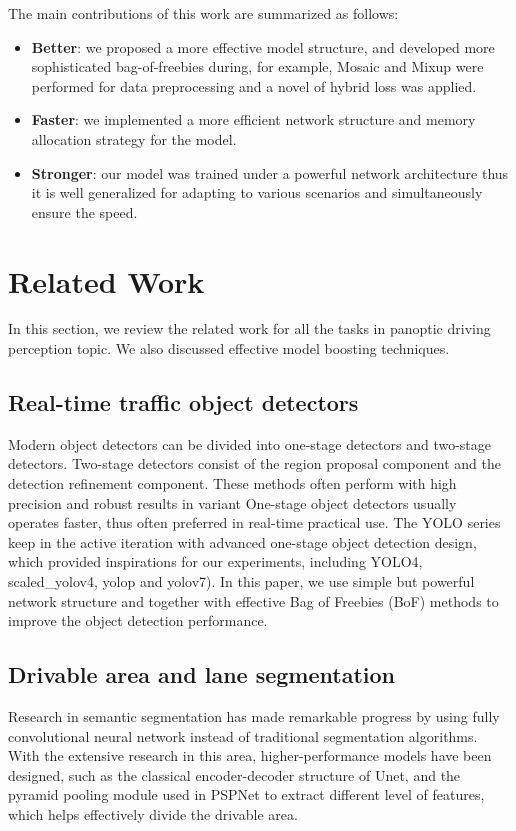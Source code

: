 \documentclass[10pt,twocolumn,letterpaper]{article}
\begin{document}
The main contributions of this work are summarized as follows:
\begin{itemize}
  \item \textbf{Better}: we proposed a more effective model structure, and developed more sophisticated bag-of-freebies during, for example, Mosaic and Mixup were performed for data preprocessing and a novel of hybrid loss was applied.
  \item \textbf{Faster}: we implemented a more efficient network structure and memory allocation strategy for the model.
  \item \textbf{Stronger}: our model was trained under a powerful network architecture thus it is well generalized for adapting to various scenarios and simultaneously ensure the speed.
\end{itemize}

\section{Related Work}

In this section, we review the related work for all the tasks in panoptic driving perception topic. We also discussed effective model boosting techniques. 


\subsection{Real-time traffic object detectors}
Modern object detectors can be divided into one-stage detectors and two-stage detectors. 
Two-stage detectors consist of the region proposal component and the detection refinement component. These methods often perform with high precision and robust results in variant 
One-stage object detectors usually operates faster, thus often preferred in real-time practical use. The YOLO series keep in the active iteration with advanced one-stage object detection design, which provided inspirations for our experiments, including YOLO4, scaled\_yolov4, yolop and yolov7). In this paper, we use simple but powerful network structure and together with effective Bag of Freebies (BoF) methods to improve the object detection performance.

\subsection{Drivable area and lane segmentation}
Research in semantic segmentation has made remarkable progress by using fully convolutional neural network \cite{dai2016r} instead of traditional segmentation algorithms. With the extensive research in this area, higher-performance models have been designed, such as the classical encoder-decoder structure of Unet, and the pyramid pooling module used in PSPNet to extract different level of features, which helps effectively divide the drivable area. 
\end{document}
